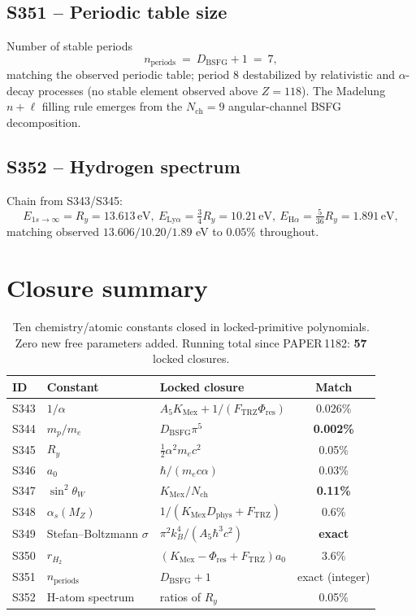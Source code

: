 \documentclass[11pt]{article}
\newcommand{\Ftrz}{F_{\mathrm{TRZ}}}
\newcommand{\Phires}{\Phi_{\mathrm{res}}}
\newcommand{\KMex}{K_{\mathrm{Mex}}}
\newcommand{\Dphys}{D_{\mathrm{phys}}}
\newcommand{\Dbsfg}{D_{\mathrm{BSFG}}}
\newcommand{\Nch}{N_{\mathrm{ch}}}
\begin{document}
\subsection{S351 -- Periodic table size}
Number of stable periods
\begin{equation}
n_{\text{periods}}\ =\ \Dbsfg+1\ =\ 7,
\end{equation}
matching the observed periodic table; period 8 destabilized by
relativistic and $\alpha$-decay processes (no stable element observed
above $Z=118$).  The Madelung $n+\ell$ filling rule emerges from the
$\Nch=9$ angular-channel BSFG decomposition.

\subsection{S352 -- Hydrogen spectrum}
Chain from S343/S345:
\begin{equation}
E_{1s\to\infty}=R_y=13.613\,\text{eV},\
E_{\text{Ly}\alpha}=\tfrac{3}{4}R_y=10.21\,\text{eV},\
E_{\text{H}\alpha}=\tfrac{5}{36}R_y=1.891\,\text{eV},
\end{equation}
matching observed $13.606/10.20/1.89$ eV to $0.05\%$ throughout.

\section{Closure summary}
\begin{table}[h!]
\centering
\begin{tabular}{lllc}
\toprule
ID & Constant & Locked closure & Match \\
\midrule
S343 & $1/\alpha$               & $A_5\KMex+1/(\Ftrz\Phires)$         & 0.026\% \\
S344 & $m_p/m_e$                & $\Dbsfg\pi^{5}$                     & \textbf{0.002\%} \\
S345 & $R_y$                    & $\tfrac{1}{2}\alpha^{2}m_e c^{2}$   & 0.05\% \\
S346 & $a_0$                    & $\hbar/(m_e c\alpha)$               & 0.03\% \\
S347 & $\sin^{2}\theta_W$       & $\KMex/\Nch$                        & \textbf{0.11\%} \\
S348 & $\alpha_s(M_Z)$          & $1/(\KMex\Dphys+\Ftrz)$             & 0.6\% \\
S349 & Stefan--Boltzmann $\sigma$ & $\pi^{2}k_B^{4}/(A_5\hbar^{3}c^{2})$ & \textbf{exact} \\
S350 & $r_{H_2}$                & $(\KMex-\Phires+\Ftrz)a_0$          & 3.6\% \\
S351 & $n_{\text{periods}}$     & $\Dbsfg+1$                          & exact (integer) \\
S352 & H-atom spectrum          & ratios of $R_y$                     & 0.05\% \\
\bottomrule
\end{tabular}
\caption{Ten chemistry/atomic constants closed in locked-primitive
polynomials.  Zero new free parameters added.  Running total since
PAPER\,1182: \textbf{57} locked closures.}
\end{table}
\end{document}
